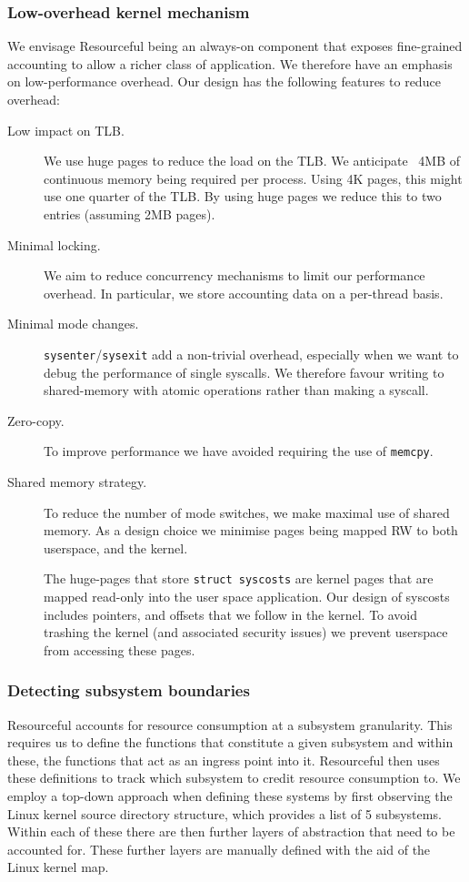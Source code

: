 \documentclass[12pt]{article}
\def\_{\textunderscore\-}
\begin{document}
  \subsubsection{Low-overhead kernel mechanism}
  We envisage Resourceful being an always-on component that exposes fine-grained accounting to allow a richer class of application. We therefore have an emphasis on low-performance overhead. Our design has the following features to reduce overhead:
  \begin{description}
  \item[Low impact on TLB.] We use huge pages to reduce the load on the TLB.
  We anticipate ~4MB of continuous memory being required per process. Using 4K pages, this might use one quarter of the TLB. By using huge pages we reduce this to two entries (assuming 2MB pages).

  \item[Minimal locking.] We aim to reduce concurrency mechanisms to limit our performance overhead. In particular, we store accounting data on a per-thread basis.

  \item[Minimal mode changes.] \texttt{sysenter}/\texttt{sysexit}  add a non-trivial overhead, especially when we want to debug the performance of single syscalls. We therefore favour writing to shared-memory with atomic operations rather than making a syscall.

  \item[Zero-copy.] To improve performance we have avoided requiring the use of \texttt{memcpy}.

  \item[Shared memory strategy.] To reduce the number of mode switches, we make maximal use of shared memory. As a design choice we minimise pages being mapped RW to both userspace, and the kernel.

  The huge-pages that store \texttt{struct sys\_costs} are kernel pages that are mapped read-only into the user space application. Our design of sys\_costs includes pointers, and offsets that we follow in the kernel. To avoid trashing the kernel (and associated security issues) we prevent userspace from accessing these pages.

  \end{description}

  \subsubsection{Detecting subsystem boundaries}
  Resourceful accounts for resource consumption at a subsystem granularity.
  This requires us to define the functions that constitute a given subsystem and within these, the functions that act as an ingress point into it.
  Resourceful then uses these definitions to track which subsystem to credit resource consumption to.
  We employ a top-down approach when defining these systems by first observing the Linux kernel source directory structure, which provides a list of 5 subsystems. Within each of these there are then further layers of abstraction that need to be accounted for. These further layers are manually defined with the aid of the Linux kernel map.
\end{document}
